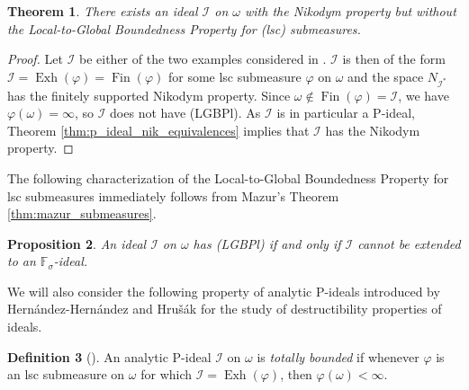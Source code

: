 \documentclass[a4paper,11pt,fleqn]{amsart}
\newtheorem{theorem}{Theorem}[section]
\newtheorem{proposition}[theorem]{Proposition}
\theoremstyle{definition}
\newtheorem{definition}[theorem]{Definition}
\theoremstyle{remark}
\numberwithin{equation}{section}
\newcommand{\F}{\mathbb{F}}
\newcommand{\aA}{\mathcal{A}}
\newcommand{\iI}{\mathcal{I}}
\DeclareMathOperator{\exh}{Exh}
\DeclareMathOperator{\fin}{Fin}
\begin{document}
\begin{theorem}\label{thm:nikodym_lgbps}
There exists an ideal $\iI$ on $\omega$ with the Nikodym property but without the Local-to-Global Boundedness Property for (lsc) submeasures.
\end{theorem}
\begin{proof}
Let $\iI$ be either of the two examples considered in \cite[Remark 4.7]{Zuc25}. $\iI$ is then of the form $\iI = \exh(\varphi) = \fin(\varphi)$ for some lsc submeasure
$\varphi$ on $\omega$ and the space $N_{\iI^*}$ has the finitely supported
Nikodym property. Since $\omega\not\in\fin(\varphi)=\iI$, we have $\varphi(\omega)=\infty$, so $\iI$ does not have (LGBPl). As $\iI$ is in particular a P-ideal, Theorem \ref{thm:p_ideal_nik_equivalences} implies that $\iI$ has the Nikodym property.%
\end{proof}

The following characterization of the Local-to-Global Boundedness Property for lsc submeasures immediately follows from Mazur's
Theorem \ref{thm:mazur_submeasures}. 

\begin{proposition}\label{prop:lgbps_char_mazur}%
An ideal $\iI$ on $\omega$ has (LGBPl) if and only if $\iI$ cannot be extended to an $\F_\sigma$-ideal.
\end{proposition}

We will also consider the following property of analytic P-ideals introduced by Hern\'{a}ndez-Hern\'{a}ndez and Hru\v{s}\'{a}k \cite[Section 3]{HHH07} for the study of destructibility properties of ideals.

\begin{definition}[\cite{HHH07}]\label{def:tot_bnded}
An analytic P-ideal $\iI$ on $\omega$ is \textit{totally bounded} if whenever $\varphi$ is an lsc submeasure on $\omega$ for which $\iI=\exh(\varphi)$, then $\varphi(\omega)<\infty$.%
\end{definition}
\end{document}
